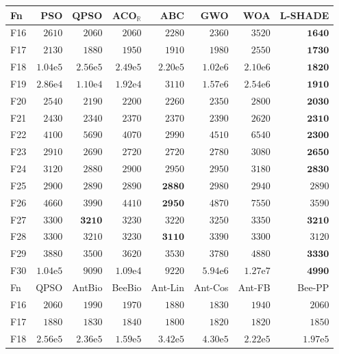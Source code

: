 \begin{tabular}{lrrrrrrr}
\toprule
Fn & PSO & QPSO & ACO$_\mathbb{R}$ & ABC & GWO & WOA & L-SHADE \\
\midrule
F16 & $2610$ & $2060$ & $2060$ & $2280$ & $2360$ & $3520$ & $\mathbf{1640}$ \\
F17 & $2130$ & $1880$ & $1950$ & $1910$ & $1980$ & $2550$ & $\mathbf{1730}$ \\
F18 & $1.04\mathrm{e}{5}$ & $2.56\mathrm{e}{5}$ & $2.49\mathrm{e}{5}$ & $2.20\mathrm{e}{5}$ & $1.02\mathrm{e}{6}$ & $2.10\mathrm{e}{6}$ & $\mathbf{1820}$ \\
F19 & $2.86\mathrm{e}{4}$ & $1.10\mathrm{e}{4}$ & $1.92\mathrm{e}{4}$ & $3110$ & $1.57\mathrm{e}{6}$ & $2.54\mathrm{e}{6}$ & $\mathbf{1910}$ \\
F20 & $2540$ & $2190$ & $2200$ & $2260$ & $2350$ & $2800$ & $\mathbf{2030}$ \\
F21 & $2430$ & $2340$ & $2370$ & $2370$ & $2390$ & $2620$ & $\mathbf{2310}$ \\
F22 & $4100$ & $5690$ & $4070$ & $2990$ & $4510$ & $6540$ & $\mathbf{2300}$ \\
F23 & $2910$ & $2690$ & $2720$ & $2720$ & $2780$ & $3080$ & $\mathbf{2650}$ \\
F24 & $3120$ & $2880$ & $2900$ & $2950$ & $2950$ & $3180$ & $\mathbf{2830}$ \\
F25 & $2900$ & $2890$ & $2890$ & $\mathbf{2880}$ & $2980$ & $2940$ & $2890$ \\
F26 & $4660$ & $3990$ & $4410$ & $\mathbf{2950}$ & $4870$ & $7550$ & $3590$ \\
F27 & $3300$ & $\mathbf{3210}$ & $3230$ & $3220$ & $3250$ & $3350$ & $\mathbf{3210}$ \\
F28 & $3300$ & $3210$ & $3230$ & $\mathbf{3110}$ & $3390$ & $3300$ & $3120$ \\
F29 & $3880$ & $3500$ & $3620$ & $3530$ & $3780$ & $4880$ & $\mathbf{3330}$ \\
F30 & $1.04\mathrm{e}{5}$ & $9090$ & $1.09\mathrm{e}{4}$ & $9220$ & $5.94\mathrm{e}{6}$ & $1.27\mathrm{e}{7}$ & $\mathbf{4990}$ \\
\midrule
Fn & QPSO & AntBio & BeeBio & Ant-Lin & Ant-Cos & Ant-FB & Bee-PP \\
\midrule
F16 & $2060$ & $1990$ & $1970$ & $1880$ & $1830$ & $1940$ & $2060$ \\
F17 & $1880$ & $1830$ & $1840$ & $1800$ & $1820$ & $1820$ & $1850$ \\
F18 & $2.56\mathrm{e}{5}$ & $2.36\mathrm{e}{5}$ & $1.59\mathrm{e}{5}$ & $3.42\mathrm{e}{5}$ & $4.30\mathrm{e}{5}$ & $2.22\mathrm{e}{5}$ & $1.97\mathrm{e}{5}$ \\

\end{tabular}
